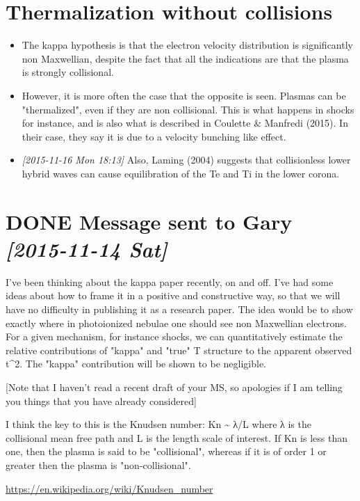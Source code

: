 \documentclass[11pt]{article}
\begin{document}
\section{Thermalization without collisions}
\label{sec:orgheadline4}
\begin{itemize}
\item The kappa hypothesis is that the electron velocity distribution is significantly non Maxwellian, despite the fact that all the indications are that the plasma is strongly collisional.

\item However, it is more often the case that the opposite is seen. Plasmas can be "thermalized", even if they are non collisional. This is what happens in shocks for instance, and is also what is described in Coulette \& Manfredi (2015). In their case, they say it is due to a velocity bunching like effect.

\item \textit{[2015-11-16 Mon 18:13] } Also, Laming (2004) suggests that collisionless lower hybrid waves can cause equilibration of the Te and Ti in the lower corona.
\end{itemize}
\section{{\bfseries\sffamily DONE} Message sent to Gary \textit{[2015-11-14 Sat]}}
\label{sec:orgheadline5}
I've been thinking about the kappa paper recently, on and off. I've had some ideas about how to frame it in a positive and constructive way, so that we will have no difficulty in publishing it as a research paper.    The idea would be to show exactly where in photoionized nebulae one should see non Maxwellian electrons.  For a given mechanism, for instance shocks, we can quantitatively estimate the relative contributions of "kappa" and "true" T structure to the apparent observed t\^{}2.  The "kappa" contribution will be shown to be negligible.

[Note that I haven't read a recent draft of your MS, so apologies if I am telling you things that you have already considered]

I think the key to this is the Knudsen number: Kn \textasciitilde{}  λ/L where λ is the collisional mean free path and L is the length scale of interest.  If Kn is less than one, then the plasma is said to be "collisional", whereas if it is of order 1 or greater then the plasma is "non-collisional".

\url{https://en.wikipedia.org/wiki/Knudsen_number}
\end{document}
